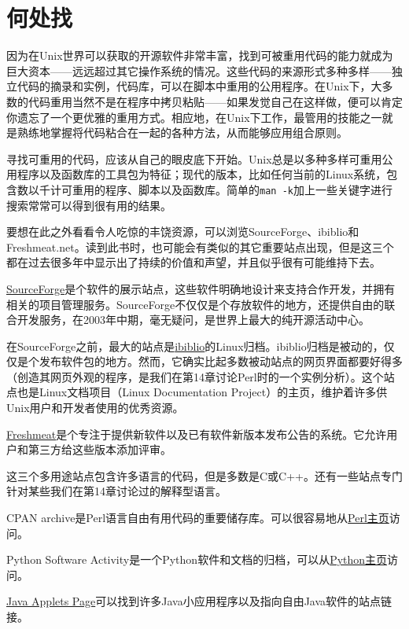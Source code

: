 \documentclass[12pt,oneside]{book}
\begin{document}
\section{何处找}
因为在Unix世界可以获取的开源软件非常丰富，找到可被重用代码的能力就成为巨大资本——远远超过其它操作系统的情况。这些代码的来源形式多种多样——独立代码的摘录和实例，代码库，可以在脚本中重用的公用程序。在Unix下，大多数的代码重用当然不是在程序中拷贝粘贴——如果发觉自己在这样做，便可以肯定你遗忘了一个更优雅的重用方式。相应地，在Unix下工作，最管用的技能之一就是熟练地掌握将代码粘合在一起的各种方法，从而能够应用组合原则。

寻找可重用的代码，应该从自己的眼皮底下开始。Unix总是以多种多样可重用公用程序以及函数库的工具包为特征；现代的版本，比如任何当前的Linux系统，包含数以千计可重用的程序、脚本以及函数库。简单的\verb+man -k+加上一些关键字进行搜索常常可以得到很有用的结果。

要想在此之外看看令人吃惊的丰饶资源，可以浏览SourceForge、ibiblio和Freshmeat.net。读到此书时，也可能会有类似的其它重要站点出现，但是这三个都在过去很多年中显示出了持续的价值和声望，并且似乎很有可能维持下去。

\href{http://www.sourceforge.net/}{SourceForge}是个软件的展示站点，这些软件明确地设计来支持合作开发，并拥有相关的项目管理服务。SourceForge不仅仅是个存放软件的地方，还提供自由的联合开发服务，在2003年中期，毫无疑问，是世界上最大的纯开源活动中心。

在SourceForge之前，最大的站点是\href{http://www.ibiblio.org/}{ibiblio}的Linux归档。ibiblio归档是被动的，仅仅是个发布软件包的地方。然而，它确实比起多数被动站点的网页界面都要好得多（创造其网页外观的程序，是我们在第14章讨论Perl时的一个实例分析）。这个站点也是Linux文档项目（Linux Documentation Project）的主页，维护着许多供Unix用户和开发者使用的优秀资源。

\href{http://www.freshmeat.net/}{Freshmeat}是个专注于提供新软件以及已有软件新版本发布公告的系统。它允许用户和第三方给这些版本添加评审。

这三个多用途站点包含许多语言的代码，但是多数是C或C++。还有一些站点专门针对某些我们在第14章讨论过的解释型语言。

CPAN archive是Perl语言自由有用代码的重要储存库。可以很容易地从\href{http://www.perl.com/perl}{Perl主页}访问。

Python Software Activity是一个Python软件和文档的归档，可以从\href{http://www.python.org/}{Python主页}访问。

\href{http://java.sun.com/applets/}{Java  Applets  Page}可以找到许多Java小应用程序以及指向自由Java软件的站点链接。
\end{document}
